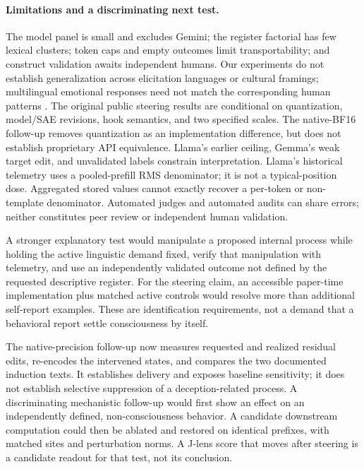 \documentclass[11pt]{article}
\begin{document}
\paragraph{Limitations and a discriminating next test.}
The model panel is small and excludes Gemini; the register factorial has
few lexical clusters; token caps and empty outcomes limit transportability;
and construct validation awaits independent humans. Our experiments do not
establish generalization across elicitation languages or cultural framings;
multilingual emotional responses need not match the corresponding human
patterns \citep{havaldar2023multilingual,dudy2024analyzing}.
The original public steering
results are conditional on quantization, model/SAE revisions, hook semantics,
and two specified scales. The native-BF16 follow-up removes quantization as
an implementation difference, but does not establish proprietary API
equivalence. Llama's earlier ceiling, Gemma's weak target edit, and
unvalidated labels constrain interpretation. Llama's historical telemetry uses a
pooled-prefill RMS denominator; it is not a typical-position dose. Aggregated
stored values cannot exactly recover a per-token or non-template denominator.
Automated judges and automated audits
can share errors; neither constitutes peer review or independent human
validation.

A stronger explanatory test would manipulate a proposed internal process
while holding the active linguistic demand fixed, verify that manipulation
with telemetry, and use an independently validated outcome not defined by
the requested descriptive register. For the steering claim, an accessible
paper-time implementation plus matched active controls would resolve more
than additional self-report examples. These are identification requirements,
not a demand that a behavioral report settle consciousness by itself.

The native-precision follow-up now measures requested and realized residual
edits, re-encodes the intervened states, and compares the two documented
induction texts. It establishes delivery and exposes baseline sensitivity;
it does not establish selective suppression of a deception-related process.
A discriminating mechanistic follow-up would first show an effect on an
independently defined, non-consciousness behavior. A candidate downstream
computation could then be ablated and restored on identical prefixes,
with matched sites and perturbation norms. A J-lens score that moves after
steering is a candidate readout for that test, not its conclusion.
\end{document}
